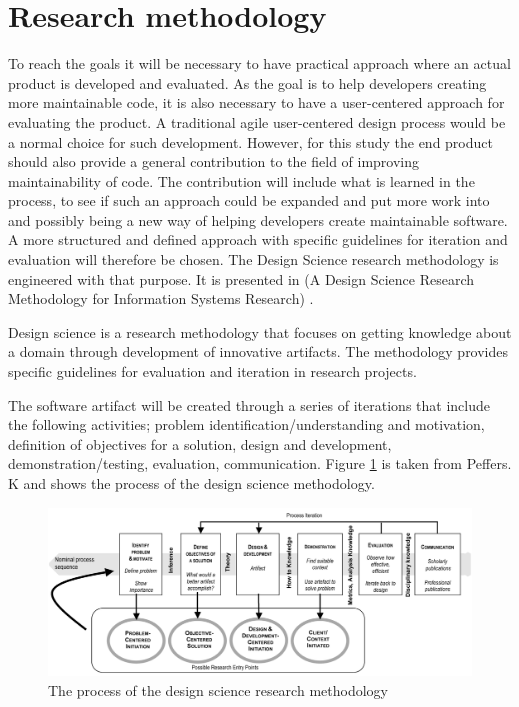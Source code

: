 \documentclass{report}
\begin{document}
\section{Research methodology}
To reach the goals it will be necessary to have practical approach where an actual product is developed and evaluated. As the goal is to help developers creating more maintainable code, it is also necessary to have a user-centered approach for evaluating the product. A traditional agile user-centered design process would be a normal choice for such development. However, for this study the end product should also provide a general contribution to the field of improving maintainability of code. The contribution will include what is learned in the process, to see if such an approach could be expanded and put more work into and possibly being a new way of helping developers create maintainable software. A more structured and defined approach with specific guidelines for iteration and evaluation will therefore be chosen. The Design Science research methodology is engineered with that purpose. It is presented in (A Design Science Research Methodology for Information Systems Research) \cite{10.2753/MIS0742-1222240302}.

Design science is a research methodology that focuses on getting knowledge about a domain through development of innovative artifacts. The methodology provides specific guidelines for evaluation and iteration in research projects. 

The software artifact will be created through a series of iterations that include the following activities; problem identification/understanding and motivation, definition of objectives for a solution, design and development, demonstration/testing, evaluation, communication. Figure \ref{fig:designScience} is taken from Peffers. K \cite{Peffers2007ADS} and shows the process of the design science methodology. 

\begin{figure}[h!]
    \centering
    \includegraphics[width=\textwidth]{report/images/designScience.png}
    \caption{The process of the design science research methodology}
    \label{fig:designScience}
\end{figure}
\end{document}
